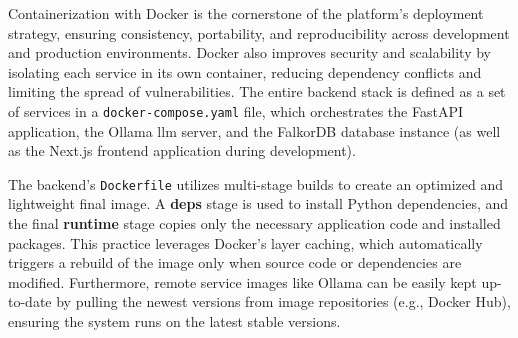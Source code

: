 Containerization with Docker \cite{DOCKER} is the cornerstone of the platform's deployment strategy, ensuring consistency, portability, and reproducibility across development and production environments. Docker also improves security and scalability by isolating each service in its own container, reducing dependency conflicts and limiting the spread of vulnerabilities. The entire backend stack is defined as a set of services in a \texttt{docker-compose.yaml} file, which orchestrates the FastAPI application, the Ollama \ac{llm} server, and the FalkorDB database instance (as well as the Next.js frontend application during development).

The backend's \texttt{Dockerfile} utilizes multi-stage builds to create an optimized and lightweight final image. A \textbf{deps} stage is used to install Python dependencies, and the final \textbf{runtime} stage copies only the necessary application code and installed packages. This practice leverages Docker's layer caching, which automatically triggers a rebuild of the image only when source code or dependencies are modified. Furthermore, remote service images like Ollama can be easily kept up-to-date by pulling the newest versions from image repositories (e.g., Docker Hub), ensuring the system runs on the latest stable versions.

